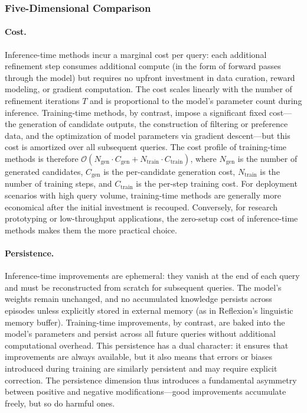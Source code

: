 \subsubsection{Five-Dimensional Comparison}

\paragraph{Cost.}
Inference-time methods incur a marginal cost per query: each additional refinement step consumes additional compute (in the form of forward passes through the model) but requires no upfront investment in data curation, reward modeling, or gradient computation. The cost scales linearly with the number of refinement iterations $T$ and is proportional to the model's parameter count during inference. Training-time methods, by contrast, impose a significant fixed cost---the generation of candidate outputs, the construction of filtering or preference data, and the optimization of model parameters via gradient descent---but this cost is amortized over all subsequent queries. The cost profile of training-time methods is therefore $\mathcal{O}(N_{\text{gen}} \cdot C_{\text{gen}} + N_{\text{train}} \cdot C_{\text{train}})$, where $N_{\text{gen}}$ is the number of generated candidates, $C_{\text{gen}}$ is the per-candidate generation cost, $N_{\text{train}}$ is the number of training steps, and $C_{\text{train}}$ is the per-step training cost. For deployment scenarios with high query volume, training-time methods are generally more economical after the initial investment is recouped. Conversely, for research prototyping or low-throughput applications, the zero-setup cost of inference-time methods makes them the more practical choice.

\paragraph{Persistence.}
Inference-time improvements are ephemeral: they vanish at the end of each query and must be reconstructed from scratch for subsequent queries. The model's weights remain unchanged, and no accumulated knowledge persists across episodes unless explicitly stored in external memory (as in Reflexion's linguistic memory buffer). Training-time improvements, by contrast, are baked into the model's parameters and persist across all future queries without additional computational overhead. This persistence has a dual character: it ensures that improvements are always available, but it also means that errors or biases introduced during training are similarly persistent and may require explicit correction. The persistence dimension thus introduces a fundamental asymmetry between positive and negative modifications---good improvements accumulate freely, but so do harmful ones.

